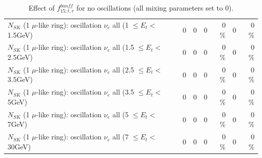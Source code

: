 \begin{table}
\begin{tabular}{| l | r | r | r  r | r  r |}
$N_{SK}$ (1 $\mu$-like ring): oscillation $\nu_{e}$ all (1 $\leq E_{t} <$ 1.5GeV) &               0 &               0 &               0 &        0 \%  &               0 &        0 \%  \\ 
$N_{SK}$ (1 $\mu$-like ring): oscillation $\nu_{e}$ all (1.5 $\leq E_{t} <$ 2.5GeV) &               0 &               0 &               0 &        0 \%  &               0 &        0 \%  \\ 
$N_{SK}$ (1 $\mu$-like ring): oscillation $\nu_{e}$ all (2.5 $\leq E_{t} <$ 3.5GeV) &               0 &               0 &               0 &        0 \%  &               0 &        0 \%  \\ 
$N_{SK}$ (1 $\mu$-like ring): oscillation $\nu_{e}$ all (3.5 $\leq E_{t} <$ 5GeV) &               0 &               0 &               0 &        0 \%  &               0 &        0 \%  \\ 
 $N_{SK}$ (1 $\mu$-like ring): oscillation $\nu_{e}$ all (5 $\leq E_{t} <$ 7GeV) &               0 &               0 &               0 &        0 \%  &               0 &        0 \%  \\ 
$N_{SK}$ (1 $\mu$-like ring): oscillation $\nu_{e}$ all (7 $\leq E_{t} <$ 30GeV) &               0 &               0 &               0 &        0 \%  &               0 &        0 \%  \\ 
\hline
\hline
\end{tabular}
\caption{ Effect of $f_{15; t, r}^{banff}$ for no oscillations (all mixing parameters set to 0). }
\label{tab:num_banff_15_1RmuT_3f_osc_t13:0}
\end{table}
\clearpage
